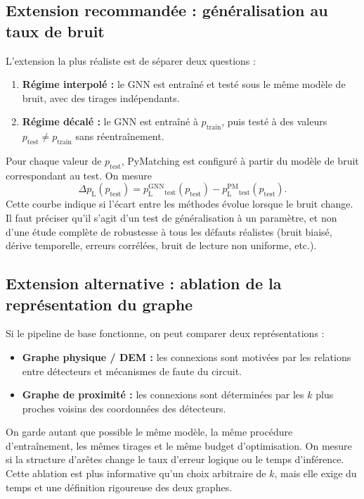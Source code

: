 \documentclass[11pt,a4paper]{article}
\newcommand{\pL}{p_{\mathrm L}}
\newcommand{\GNN}{\mathrm{GNN}}
\newcommand{\PM}{\mathrm{PM}}
\begin{document}
\subsection{Extension recommandée : généralisation au taux de bruit}

L'extension la plus réaliste est de séparer deux questions :
\begin{enumerate}
 \item \textbf{Régime interpolé :} le GNN est entraîné et testé sous le même
 modèle de bruit, avec des tirages indépendants.
 \item \textbf{Régime décalé :} le GNN est entraîné à $p_{\mathrm{train}}$,
 puis testé à des valeurs $p_{\mathrm{test}}\ne p_{\mathrm{train}}$ sans
 réentraînement.
\end{enumerate}

Pour chaque valeur de $p_{\mathrm{test}}$, PyMatching est configuré à partir
du modèle de bruit correspondant au test. On mesure
\[
 \Delta\pL(p_{\mathrm{test}})=
 \pL^{\GNN}_{\mathrm{test}}(p_{\mathrm{test}})
 -\pL^{\PM}_{\mathrm{test}}(p_{\mathrm{test}}).
\]
Cette courbe indique si l'écart entre les méthodes évolue lorsque le bruit
change. Il faut préciser qu'il s'agit d'un test de généralisation à un
paramètre, et non d'une étude complète de robustesse à tous les défauts
réalistes (bruit biaisé, dérive temporelle, erreurs corrélées, bruit de
lecture non uniforme, etc.).

\subsection{Extension alternative : ablation de la représentation du graphe}

Si le pipeline de base fonctionne, on peut comparer deux représentations :
\begin{itemize}
 \item \textbf{Graphe physique / DEM :} les connexions sont motivées par
 les relations entre détecteurs et mécanismes de faute du circuit.
 \item \textbf{Graphe de proximité :} les connexions sont déterminées par
 les $k$ plus proches voisins des coordonnées des détecteurs.
\end{itemize}
On garde autant que possible le même modèle, la même procédure
d'entraînement, les mêmes tirages et le même budget d'optimisation. On
mesure si la structure d'arêtes change le taux d'erreur logique ou le temps
d'inférence. Cette ablation est plus informative qu'un choix arbitraire de
$k$, mais elle exige du temps et une définition rigoureuse des deux graphes.
\end{document}
